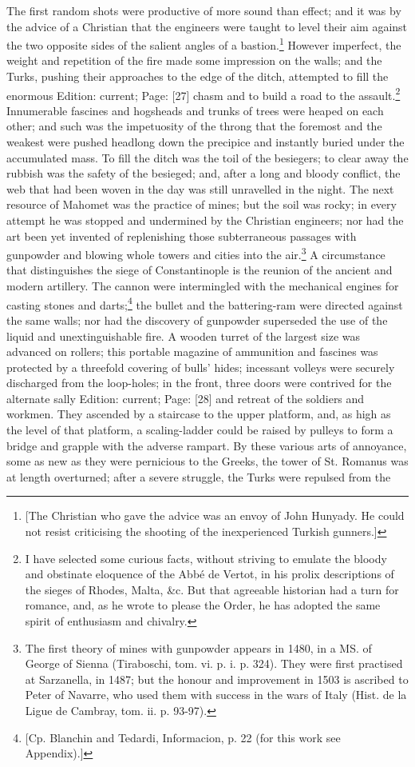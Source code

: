 The first random shots were productive of more sound than effect; and it was by the advice of a Christian that the engineers were taught to level their aim against the two opposite sides of the salient angles of a bastion.\footnote{[The Christian who gave the advice was an envoy of John Hunyady. He could not resist criticising the shooting of the inexperienced Turkish gunners.]} However imperfect, the weight and repetition of the fire made some impression on the walls; and the Turks, pushing their approaches to the edge of the ditch, attempted to fill the enormous Edition: current; Page: [27] chasm and to build a road to the assault.\footnote{I have selected some curious facts, without striving to emulate the bloody and obstinate eloquence of the Abbé de Vertot, in his prolix descriptions of the sieges of Rhodes, Malta, \&c. But that agreeable historian had a turn for romance, and, as he wrote to please the Order, he has adopted the same spirit of enthusiasm and chivalry.} Innumerable fascines and hogsheads and trunks of trees were heaped on each other; and such was the impetuosity of the throng that the foremost and the weakest were pushed headlong down the precipice and instantly buried under the accumulated mass. To fill the ditch was the toil of the besiegers; to clear away the rubbish was the safety of the besieged; and, after a long and bloody conflict, the web that had been woven in the day was still unravelled in the night. The next resource of Mahomet was the practice of mines; but the soil was rocky; in every attempt he was stopped and undermined by the Christian engineers; nor had the art been yet invented of replenishing those subterraneous passages with gunpowder and blowing whole towers and cities into the air.\footnote{The first theory of mines with gunpowder appears in 1480, in a MS. of George of Sienna (Tiraboschi, tom. vi. p. i. p. 324). They were first practised at Sarzanella, in 1487; but the honour and improvement in 1503 is ascribed to Peter of Navarre, who used them with success in the wars of Italy (Hist. de la Ligue de Cambray, tom. ii. p. 93-97).} A circumstance that distinguishes the siege of Constantinople is the reunion of the ancient and modern artillery. The cannon were intermingled with the mechanical engines for casting stones and darts;\footnote{[Cp. Blanchin and Tedardi, Informacion, p. 22 (for this work see Appendix).]} the bullet and the battering-ram were directed against the same walls; nor had the discovery of gunpowder superseded the use of the liquid and unextinguishable fire. A wooden turret of the largest size was advanced on rollers; this portable magazine of ammunition and fascines was protected by a threefold covering of bulls\texthebrew{}’ hides; incessant volleys were securely discharged from the loop-holes; in the front, three doors were contrived for the alternate sally Edition: current; Page: [28] and retreat of the soldiers and workmen. They ascended by a staircase to the upper platform, and, as high as the level of that platform, a scaling-ladder could be raised by pulleys to form a bridge and grapple with the adverse rampart. By these various arts of annoyance, some as new as they were pernicious to the Greeks, the tower of St. Romanus was at length overturned; after a severe struggle, the Turks were repulsed from the 